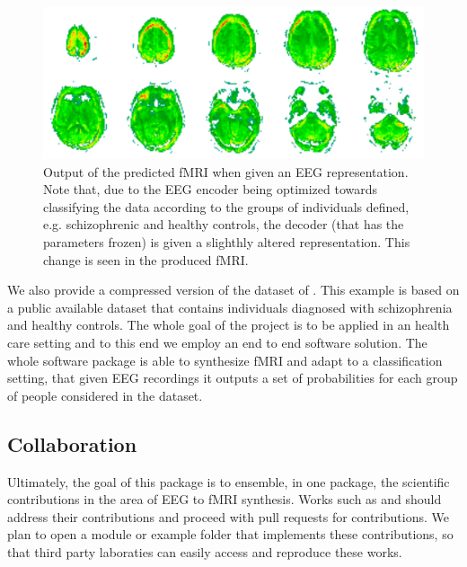 \begin{figure}[t]
    \centering
    \includegraphics[width=\textwidth]{figures/discriminative.png}
    \caption{Output of the predicted fMRI when given an EEG representation. Note that, due to the EEG encoder being optimized towards classifying the data according to the groups of individuals defined, e.g. schizophrenic and healthy controls, the decoder (that has the parameters frozen) is given a slighthly altered representation. This change is seen in the produced fMRI.}
    \label{fig:discriminative}
\end{figure}
We also provide a compressed version of the dataset of \cite{dataset2022fribourg}. This example is based on a public available dataset that contains individuals diagnosed with schizophrenia and healthy controls. The whole goal of the project is to be applied in an health care setting and to this end we employ an end to end software solution. The whole software package is able to synthesize fMRI and adapt to a classification setting, that given EEG recordings it outputs a set of probabilities for each group of people considered in the dataset.



\subsection{Collaboration}\label{section:collabs}

Ultimately, the goal of this package is to ensemble, in one package, the scientific contributions in the area of EEG to fMRI synthesis. Works such as \cite{calhas2022eeg} and \cite{liu2019convolutional} should address their contributions and proceed with pull requests for contributions. We plan to open a module or example folder that implements these contributions, so that third party laboraties can easily access and reproduce these works. 

